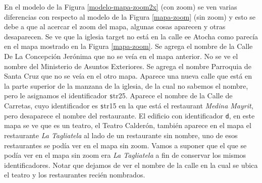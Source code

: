 En el modelo de la Figura \ref{modelo-mapa-zoom2x} (con zoom) se ven varias diferencias con respecto al modelo de la Figura \ref{mapa-zoom} 
(sin zoom) y esto se debe a que al acercar el zoom del mapa, algunas cosas aparecen y otras desaparecen. Se ve que la iglesia target no est\'a
 en la calle ee Atocha como parec\'ia en el mapa mostrado en la Figura \ref{mapa-zoom}. Se agrega el nombre de la Calle De La Concepci\'on 
Jer\'onima que no se ve\'ia en el mapa anterior. No se ve el nombre del Ministerio de Asuntos Exteriores. Se agrega el nombre Parroquia de Santa Cruz que no se ve\'ia en el otro mapa. Aparece una nueva calle que est\'a en la parte superior de la manzana de la iglesia, 
de la cual no sabemos el nombre, pero le asignamos el identificador {\texttt str25}. Aparece el nombre de la Calle de Carretas, 
cuyo identificador
 es {\texttt str15} en la que est\'a el restaurant {\it Medina Mayrit}, pero desaparece el nombre del restaurante. 
El edificio con identificador {\texttt d}, en este mapa se ve que es un teatro, el Teatro Calder\'on, tambi\'en aparece en el mapa el restaurante {\it La Tagliatela} al lado
 de un restaurante sin nombre, uno de esos restaurantes se pod\'ia ver en el mapa sin zoom. Vamos a suponer que el que se pod\'ia ver en el mapa sin zoom era {\it La Tagliatela} a fin de conservar los mismos identificadores. Notar que dejamos de ver el nombre de la calle 
en la cual se ubica el teatro y los restaurantes reci\'en nombrados.

